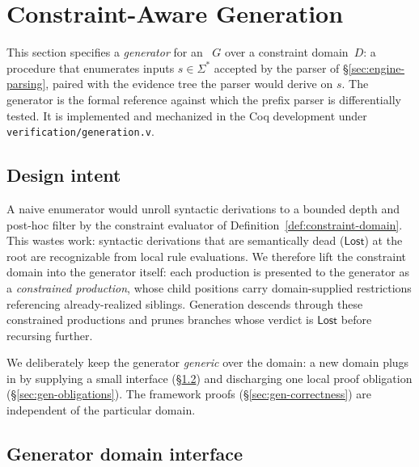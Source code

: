 
\section{Constraint-Aware Generation}
\label{sec:generation}

This section specifies a \emph{generator} for an \spg{}~\(G\) over a constraint
domain~\(D\): a procedure that enumerates inputs \(s \in \Sigma^\ast\) accepted
by the parser of \S\ref{sec:engine-parsing}, paired with the evidence tree the
parser would derive on \(s\). The generator is the formal reference against
which the prefix parser is differentially tested. It is implemented and
mechanized in the Coq development under \verb|verification/generation.v|.

\subsection{Design intent}
\label{sec:gen-intent}

A naive enumerator would unroll syntactic derivations to a bounded depth and
post-hoc filter by the constraint evaluator of
Definition~\ref{def:constraint-domain}. This wastes work: syntactic
derivations that are semantically dead (\(\mathsf{Lost}\)) at the root are
recognizable from local rule evaluations. We therefore lift the constraint
domain into the generator itself: each production is presented to the
generator as a \emph{constrained production}, whose child positions carry
domain-supplied restrictions referencing already-realized siblings.
Generation descends through these constrained productions and prunes branches
whose verdict is \(\mathsf{Lost}\) before recursing further.

We deliberately keep the generator \emph{generic} over the domain: a new
domain plugs in by supplying a small interface (\S\ref{sec:gen-domain}) and
discharging one local proof obligation (\S\ref{sec:gen-obligations}). The
framework proofs (\S\ref{sec:gen-correctness}) are independent of the
particular domain.

\subsection{Generator domain interface}
\label{sec:gen-domain}


